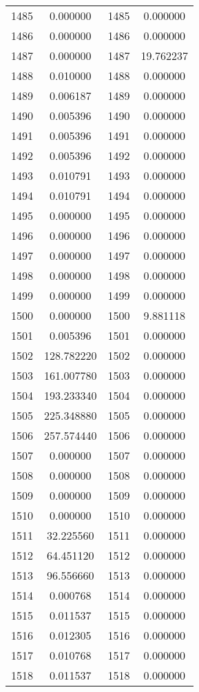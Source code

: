 \documentclass[12pt]{article}
\begin{document}
\begin{longtable}{@{}cccc@{}}
1485 & 0.000000 & 1485 & 0.000000 \\
1486 & 0.000000 & 1486 & 0.000000 \\
1487 & 0.000000 & 1487 & 19.762237 \\
1488 & 0.010000 & 1488 & 0.000000 \\
1489 & 0.006187 & 1489 & 0.000000 \\
1490 & 0.005396 & 1490 & 0.000000 \\
1491 & 0.005396 & 1491 & 0.000000 \\
1492 & 0.005396 & 1492 & 0.000000 \\
1493 & 0.010791 & 1493 & 0.000000 \\
1494 & 0.010791 & 1494 & 0.000000 \\
1495 & 0.000000 & 1495 & 0.000000 \\
1496 & 0.000000 & 1496 & 0.000000 \\
1497 & 0.000000 & 1497 & 0.000000 \\
1498 & 0.000000 & 1498 & 0.000000 \\
1499 & 0.000000 & 1499 & 0.000000 \\
1500 & 0.000000 & 1500 & 9.881118 \\
1501 & 0.005396 & 1501 & 0.000000 \\
1502 & 128.782220 & 1502 & 0.000000 \\
1503 & 161.007780 & 1503 & 0.000000 \\
1504 & 193.233340 & 1504 & 0.000000 \\
1505 & 225.348880 & 1505 & 0.000000 \\
1506 & 257.574440 & 1506 & 0.000000 \\
1507 & 0.000000 & 1507 & 0.000000 \\
1508 & 0.000000 & 1508 & 0.000000 \\
1509 & 0.000000 & 1509 & 0.000000 \\
1510 & 0.000000 & 1510 & 0.000000 \\
1511 & 32.225560 & 1511 & 0.000000 \\
1512 & 64.451120 & 1512 & 0.000000 \\
1513 & 96.556660 & 1513 & 0.000000 \\
1514 & 0.000768 & 1514 & 0.000000 \\
1515 & 0.011537 & 1515 & 0.000000 \\
1516 & 0.012305 & 1516 & 0.000000 \\
1517 & 0.010768 & 1517 & 0.000000 \\
1518 & 0.011537 & 1518 & 0.000000 \\

\end{longtable}
\end{document}
